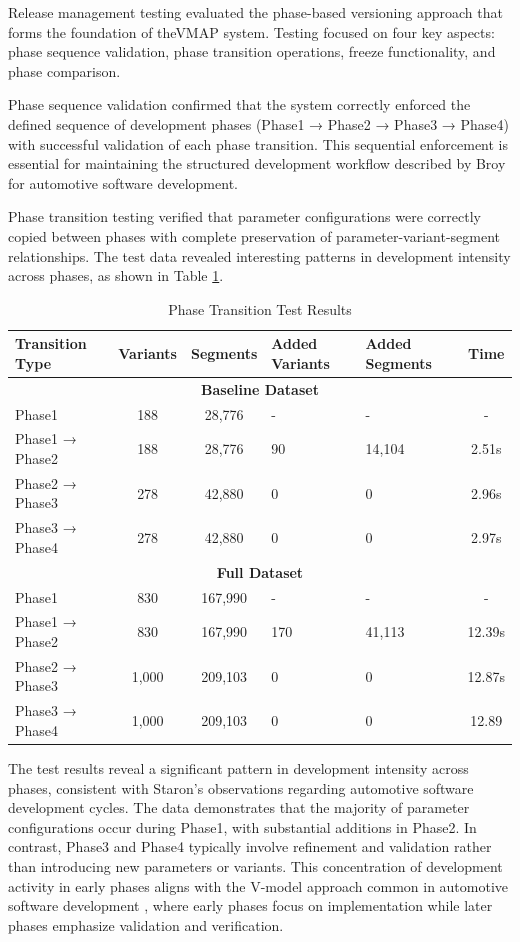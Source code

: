 Release management testing evaluated the phase-based versioning approach that forms the foundation of the\ac{VMAP} system. Testing focused on four key aspects: phase sequence validation, phase transition operations, freeze functionality, and phase comparison.

Phase sequence validation confirmed that the system correctly enforced the defined sequence of development phases (Phase1 → Phase2 → Phase3 → Phase4) with successful validation of each phase transition. This sequential enforcement is essential for maintaining the structured development workflow described by Broy \cite{broy2006challenges} for automotive software development.

Phase transition testing verified that parameter configurations were correctly copied between phases with complete preservation of parameter-variant-segment relationships. The test data revealed interesting patterns in development intensity across phases, as shown in Table \ref{tab:phase-transition-results}.

\begin{table}[h]
\centering
\caption{Phase Transition Test Results}
\label{tab:phase-transition-results}
\begin{tabular}{|l|c|c|p{2cm}|p{2cm}|c|}
\hline
\textbf{Transition Type} & \textbf{Variants} & \textbf{Segments} & \textbf{Added Variants} & \textbf{Added Segments} & \textbf{Time} \\
\hline
\multicolumn{6}{|c|}{\textbf{Baseline Dataset}} \\
\hline
Phase1 & 188 & 28,776 & - & - & - \\
\hline
Phase1 → Phase2 & 188 & 28,776 & 90 & 14,104 & 2.51s \\
\hline
Phase2 → Phase3 & 278 & 42,880 & 0 & 0 & 2.96s \\
\hline
Phase3 → Phase4 & 278 & 42,880 & 0 & 0 & 2.97s \\
\hline
\multicolumn{6}{|c|}{\textbf{Full Dataset}} \\
\hline
Phase1 & 830 & 167,990 & - & - & - \\
\hline
Phase1 → Phase2 & 830 & 167,990 & 170 & 41,113 & 12.39s \\
\hline
Phase2 → Phase3 & 1,000 & 209,103 & 0 & 0 & 12.87s \\
\hline
Phase3 → Phase4 & 1,000 & 209,103 & 0 & 0 & 12.89 \\
\hline
\end{tabular}
\end{table}

The test results reveal a significant pattern in development intensity across phases, consistent with Staron's observations \cite{staron2021automotive} regarding automotive software development cycles. The data demonstrates that the majority of parameter configurations occur during Phase1, with substantial additions in Phase2. In contrast, Phase3 and Phase4 typically involve refinement and validation rather than introducing new parameters or variants. This concentration of development activity in early phases aligns with the V-model approach common in automotive software development \cite{pretschner2007software}, where early phases focus on implementation while later phases emphasize validation and verification.

